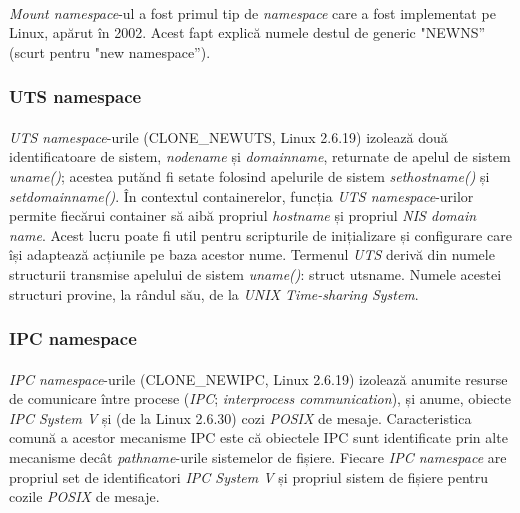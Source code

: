             \paragraph{} \textit{Mount namespace}-ul a fost primul tip de \textit{namespace} care a fost implementat pe Linux, apărut în 2002. Acest fapt explică numele destul de generic "NEWNS” (scurt pentru "new namespace”). \cite{ns:lwn}

        \subsubsection{UTS namespace}
            \paragraph{} \textit{UTS namespace}-urile (CLONE\_NEWUTS, Linux 2.6.19) izolează două identificatoare de sistem, \textit{nodename} și \textit{domainname}, returnate de apelul de sistem \textit{uname()}; acestea putănd fi setate folosind apelurile de sistem \textit{sethostname()} și \textit{setdomainname()}. În contextul containerelor, funcția \textit{UTS namespace}-urilor permite fiecărui container să aibă propriul \textit{hostname} și propriul \textit{NIS domain name}. Acest lucru poate fi util pentru scripturile de inițializare și configurare care își adaptează acțiunile pe baza acestor nume. Termenul \textit{UTS} derivă din numele structurii transmise apelului de sistem \textit{uname()}: struct utsname. Numele acestei structuri provine, la rândul său, de la \textit{UNIX Time-sharing System}. \cite{ns:lwn}

        \subsubsection{IPC namespace}
            \paragraph{} \textit{IPC namespace}-urile (CLONE\_NEWIPC, Linux 2.6.19) izolează anumite resurse de comunicare între procese (\textit{IPC}; \textit{interprocess communication}), și anume, obiecte \textit{IPC System V} și (de la Linux 2.6.30) cozi \textit{POSIX} de mesaje. Caracteristica comună a acestor mecanisme IPC este că obiectele IPC sunt identificate prin alte mecanisme decât \textit{pathname}-urile sistemelor de fișiere. Fiecare \textit{IPC namespace} are propriul set de identificatori \textit{IPC System V} și propriul sistem de fișiere pentru cozile \textit{POSIX} de mesaje. \cite{ns:lwn}

